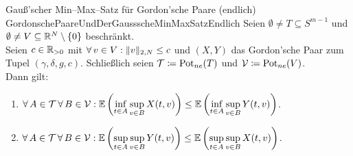 \begin{lemma}{Gauß'scher Min--Max--Satz für Gordon'sche Paare (endlich)}
             {GordonschePaareUndDerGaussscheMinMaxSatzEndlich}
Seien $\emptyset \neq T \subseteq S^{m-1}$ und
$\emptyset \neq V \subseteq \mathbb{R}^N\setminus\left\{0\right\}$ beschränkt.\\
Seien $c \in \mathbb{R}_{>0}$ mit
$\forall\, v \in V: \lVert v\rVert _{2, N} \le c$
und $(X, Y)$ das Gordon'sche Paar zum Tupel $(\gamma, \delta, g, c)$.
Schließlich seien $\mathcal{T} \coloneqq  \mathop{\textrm{Pot}}\nolimits_{ne}(T)$ und $\mathcal{V} \coloneqq  \mathop{\textrm{Pot}}\nolimits_{ne}(V)$.\\
Dann gilt:
\begin{enumerate}[(1)]
	\item \label{GordonschePaareUndDerGaussscheMinMaxSatzEndlich1}
	$\forall\, A \in \mathcal{T}\, \forall\, B \in \mathcal{V}:
	\mathbb{E}\left(\underset{t \in A}\inf\,\underset{v \in B}\sup\,X(t, v) \right)
	\le \mathbb{E}\left(\underset{t \in A}\inf\,\underset{v \in B}\sup\,Y(t, v) \right)$.
	\item \label{GordonschePaareUndDerGaussscheMinMaxSatzEndlich2}
	$\forall\, A \in \mathcal{T}\, \forall\, B \in \mathcal{V}:
	\mathbb{E}\left(\underset{t \in A}\sup\,\underset{v \in B}\sup\,Y(t, v) \right)
	\le \mathbb{E}\left(\underset{t \in A}\sup\,\underset{v \in B}\sup\,X(t, v) \right)$.
\end{enumerate}
\end{lemma}
